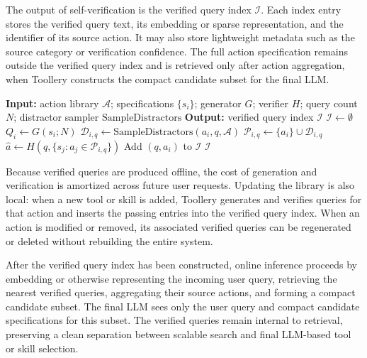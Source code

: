 \documentclass[11pt]{article}
\begin{document}
The output of self-verification is the verified query index $\mathcal{I}$. Each index entry stores the verified query text, its embedding or sparse representation, and the identifier of its source action. It may also store lightweight metadata such as the source category or verification confidence. The full action specification remains outside the verified query index and is retrieved only after action aggregation, when Toollery constructs the compact candidate subset for the final LLM.

\begin{algorithm}[t]
\caption{Offline Construction of the Verified Query Index}
\label{alg:verified_query_index}
\begin{algorithmic}[1]
\State \textbf{Input:} action library $\mathcal{A}$; specifications $\{s_i\}$; generator $G$; verifier $H$; query count $N$; distractor sampler $\mathrm{SampleDistractors}$
\State \textbf{Output:} verified query index $\mathcal{I}$
\State $\mathcal{I} \leftarrow \emptyset$
    \State $Q_i \leftarrow G(s_i; N)$ 
        \State $\mathcal{D}_{i,q} \leftarrow \mathrm{SampleDistractors}(a_i, q, \mathcal{A})$
        \State $\mathcal{P}_{i,q} \leftarrow \{a_i\} \cup \mathcal{D}_{i,q}$
        \State $\hat{a} \leftarrow H(q, \{s_j : a_j \in \mathcal{P}_{i,q}\})$
            \State Add $(q, a_i)$ to $\mathcal{I}$ 
        \EndIf
    \EndFor
\EndFor
\State \Return $\mathcal{I}$
\end{algorithmic}
\end{algorithm}

Because verified queries are produced offline, the cost of generation and verification is amortized across future user requests. Updating the library is also local: when a new tool or skill is added, Toollery generates and verifies queries for that action and inserts the passing entries into the verified query index. When an action is modified or removed, its associated verified queries can be regenerated or deleted without rebuilding the entire system.

After the verified query index has been constructed, online inference proceeds by embedding or otherwise representing the incoming user query, retrieving the nearest verified queries, aggregating their source actions, and forming a compact candidate subset. The final LLM sees only the user query and compact candidate specifications for this subset. The verified queries remain internal to retrieval, preserving a clean separation between scalable search and final LLM-based tool or skill selection.
\end{document}
